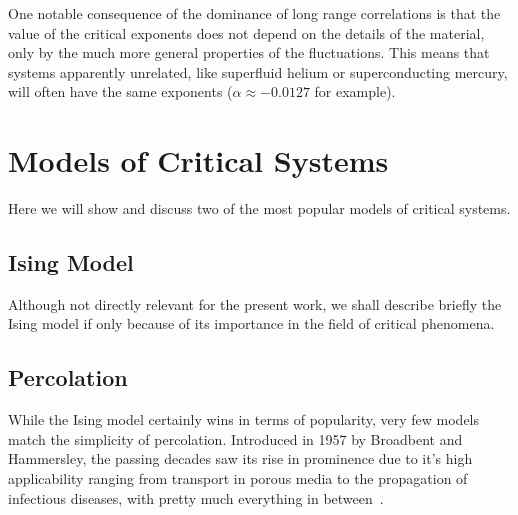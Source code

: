 One notable consequence of the dominance of long range correlations is that the
value of the critical exponents does not depend on the details of the material,
only by the much more general properties of the fluctuations. This means that
systems apparently unrelated, like superfluid helium or superconducting mercury,
will often have the same exponents ($\alpha\approx-0.0127$ for example).



\section{Models of Critical Systems}
\label{sec:models}

Here we will show and discuss two of the most popular models of critical systems.

\subsection{Ising Model}
\label{sec:ising}

Although not directly relevant for the present work, we shall describe briefly
the Ising model if only because of its importance in the field of critical
phenomena.


\subsection{Percolation}
\label{sec:perc}

While the Ising model certainly wins in terms of popularity, very few models
match the simplicity of percolation. Introduced in 1957 by Broadbent and
Hammersley, the passing decades saw its rise in prominence due to it's high
applicability ranging from transport in porous media to the propagation of
infectious diseases, with pretty much everything in between~\cite{Araujo2013}.
